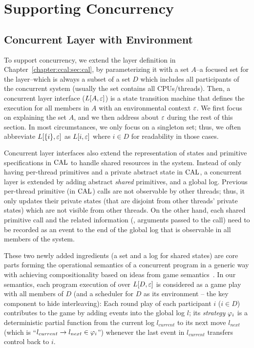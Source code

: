 \section{Supporting Concurrency}
\label{chapter:ccal:sec:ccal-overview}

\subsection{Concurrent Layer with Environment}
\label{chapter:ccal:subsec:concurrent-layer-with-environment}

To support concurrency, 
we extend the layer definition in Chapter~\ref{chapter:ccal:sec:cal},
by parameterizing it with a set $A$--a focused set for the layer--which is always a subset of a set $D$ which includes all participants of the concurrent system (usually the set contains all CPUs/threads).
Then,  a concurrent layer interface ($L[A, {\varepsilon}]$) is a state transition machine
that defines the execution for all members in $A$ with an environmental context ${\varepsilon}$.
We first focus on explaining the set $A$, and we then address about ${\varepsilon}$ during the rest of this section.
In most circumstances, we only focus on a singleton set; 
thus, we often abbreviate $L[\{i\},{\varepsilon}]$ as $L[i, {\varepsilon}]$ where $i\in{}D$ for readability in those cases.


Concurrent layer interfaces also extend the representation of states and primitive specifications in $\mathrm{CAL}$ to handle shared resources in the system. 
Instead of only having per-thread primitives and a private abstract state in $\mathrm{CAL}$, 
a concurrent layer is extended by adding abstract \textit{shared} primitives, 
and a global log. 
Previous per-thread primitive (in $\mathrm{CAL}$) calls are not observable by other threads; thus, it only updates their private states (that are disjoint from other threads' private states) which are not visible from other threads. 
On the other hand, each shared primitive call and the related information (\ie, arguments passed to the call) 
need to be recorded as an event to the end of the global log that
is observable in all members of the system.

These two newly added ingredients (a set and a log for shared states)  are core parts forming the operational semantics of a concurrent program 
 in a generic way with achieving  compositionality based on
ideas from game semantics~\cite{gsinvite}. 
In our semantics, 
each program execution of  over 
$L[D, {\varepsilon}]$ is considered as a game play with all members of $D$ 
(and a scheduler for $D$ as its environment -- the key component to hide interleaving):
Each round play of each participant $i$ ($i\in{}D$) contributes to the game 
by adding events into the global log $l$; its {\em strategy}
$\varphi_{i}$ is a deterministic partial function from
the current log $l_{current}$ to its next move $l_{next}$ (which is ``$l_{current} \rightarrow l_{next} \in \varphi_{i}$'') whenever
the last event in $l_{current}$ transfers control back to $i$. 

